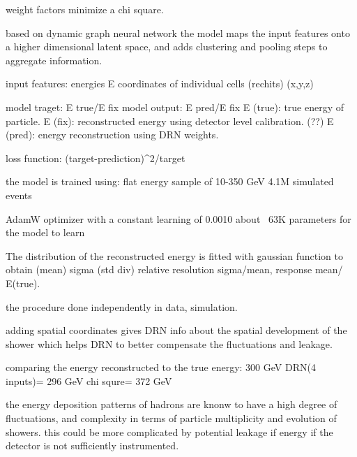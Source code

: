 

weight factors minimize a chi square.


based on dynamic graph neural network
the model maps the input features onto a higher dimensional latent space, and adds clustering and pooling steps to aggregate information.

input features:
energies E
coordinates of individual cells (rechits) (x,y,z) 

model traget: E true/E fix 
model output: E pred/E fix
E (true): true energy of particle. 
E (fix): reconstructed energy using detector level calibration. (??)
E (pred): energy reconstruction using DRN weights.

loss function: (target-prediction)^2/target

the model is trained using:
flat energy sample of 10-350 GeV
4.1M simulated events

AdamW optimizer with a constant learning of 0.0010
about ~63K parameters for the model to learn

The distribution of the reconstructed energy is fitted with gaussian function to obtain (mean) sigma (std div)
relative resolution sigma/mean, response mean/ E(true).

the procedure done independently in data, simulation. 

adding spatial coordinates gives DRN info about the spatial development of the shower which helps DRN to better compensate the fluctuations and leakage.

comparing the energy reconstructed to the true energy: 300 GeV
DRN(4 inputs)= 296 GeV
chi squre= 372 GeV

the energy deposition patterns of hadrons are knonw to have a high degree of fluctuations, and complexity in terms of particle multiplicity and evolution of showers.
this could be more complicated by potential leakage if energy if the detector is not sufficiently instrumented.

